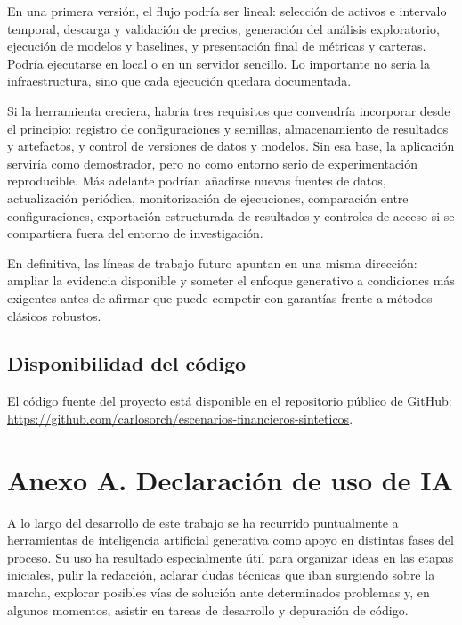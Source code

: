 \documentclass[11pt,a4paper,spanish,oneside]{book}
\numberwithin{equation}{chapter}
\numberwithin{figure}{chapter}
\begin{document}
En una primera versión, el flujo podría ser lineal: selección de activos e intervalo temporal, descarga y validación de precios, generación del análisis exploratorio, ejecución de modelos y baselines, y presentación final de métricas y carteras. Podría ejecutarse en local o en un servidor sencillo. Lo importante no sería la infraestructura, sino que cada ejecución quedara documentada.

Si la herramienta creciera, habría tres requisitos que convendría incorporar desde el principio: registro de configuraciones y semillas, almacenamiento de resultados y artefactos, y control de versiones de datos y modelos. Sin esa base, la aplicación serviría como demostrador, pero no como entorno serio de experimentación reproducible. Más adelante podrían añadirse nuevas fuentes de datos, actualización periódica, monitorización de ejecuciones, comparación entre configuraciones, exportación estructurada de resultados y controles de acceso si se compartiera fuera del entorno de investigación.

En definitiva, las líneas de trabajo futuro apuntan en una misma dirección: ampliar la evidencia disponible y someter el enfoque generativo a condiciones más exigentes antes de afirmar que puede competir con garantías frente a métodos clásicos robustos.

\section{Disponibilidad del código}

El código fuente del proyecto está disponible en el repositorio público de GitHub: \url{https://github.com/carlosorch/escenarios-financieros-sinteticos}.

\backmatter



\chapter{Anexo A. Declaración de uso de IA}
A lo largo del desarrollo de este trabajo se ha recurrido puntualmente a herramientas de inteligencia artificial generativa como apoyo en distintas fases del proceso. Su uso ha resultado especialmente útil para organizar ideas en las etapas iniciales, pulir la redacción, aclarar dudas técnicas que iban surgiendo sobre la marcha, explorar posibles vías de solución ante determinados problemas y, en algunos momentos, asistir en tareas de desarrollo y depuración de código.
\end{document}
